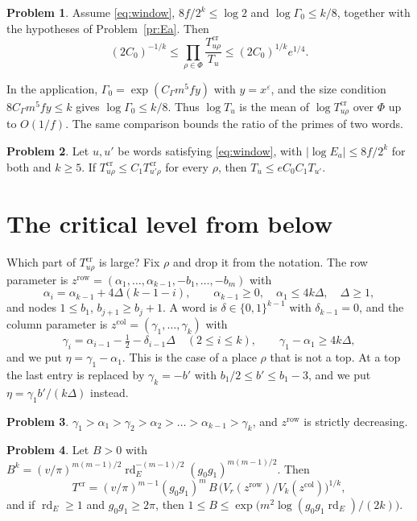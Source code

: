 \documentclass[reqno]{amsart}
\theoremstyle{definition}
\newtheorem{problem}{Problem}[section]
\theoremstyle{plain}
\theoremstyle{remark}
\newcommand{\rd}{\operatorname{rd}}
\newcommand{\Tc}{T^{\mathrm{cr}}}
\newcommand{\zr}{z^{\mathrm{row}}}
\newcommand{\zc}{z^{\mathrm{col}}}
\begin{document}
\begin{problem}\label{pr:window}
Assume \eqref{eq:window}, $8f/2^k\le\log2$ and $\log\Gamma_0\le k/8$,
together with the hypotheses of Problem~\ref{pr:Ea}.  Then
\[
 (2C_0)^{-1/k}\le\prod_{\rho\in\Phi}\frac{\Tc_{u\rho}}{T_u}
 \le(2C_0)^{1/k}e^{1/4}.
\]
\end{problem}

In the application, $\Gamma_0=\exp(C_\Gamma m^5fy)$ with $y=x^\varepsilon$, and
the size condition $8C_\Gamma m^5fy\le k$ gives $\log\Gamma_0\le k/8$.
Thus $\log T_u$ is the mean of $\log\Tc_{u\rho}$ over $\Phi$ up to
$O(1/f)$.  The same comparison bounds the ratio of the primes of two
words.

\begin{problem}\label{pr:ratio}
Let $u,u'$ be words satisfying \eqref{eq:window}, with
$|\log E_a|\le8f/2^k$ for both and $k\ge5$.  If
$\Tc_{u\rho}\le C_1\Tc_{u'\rho}$ for every $\rho$, then
$T_u\le eC_0C_1T_{u'}$.
\end{problem}

\section{The critical level from below}\label{sec:below}

Which part of $\Tc_{u\rho}$ is large?  Fix $\rho$ and drop it from the
notation.  The row parameter is
$\zr=(\alpha_1,\dots,\alpha_{k-1},-b_1,\dots,-b_m)$ with
\[
 \alpha_i=\alpha_{k-1}+4\Delta(k-1-i),\qquad
 \alpha_{k-1}\ge0,\quad \alpha_1\le4k\Delta,\quad\Delta\ge1,
\]
and nodes $1\le b_1$, $b_{j+1}\ge b_j+1$.  A word is
$\delta\in\{0,1\}^{k-1}$ with $\delta_{k-1}=0$, and the column parameter
is $\zc=(\gamma_1,\dots,\gamma_k)$ with
\[
 \gamma_i=\alpha_{i-1}-\tfrac12-\delta_{i-1}\Delta\quad(2\le i\le k),
 \qquad \gamma_1-\alpha_1\ge4k\Delta,
\]
and we put $\eta=\gamma_1-\alpha_1$.
This is the case of a place $\rho$ that is not a top.  At a top the
last entry is replaced by $\gamma_k=-b'$ with $b_1/2\le b'\le b_1-3$, and
we put $\eta=\gamma_1b'/(k\Delta)$ instead.

\begin{problem}\label{pr:interlace}
$\gamma_1>\alpha_1>\gamma_2>\alpha_2>\dots>\alpha_{k-1}>\gamma_k$, and
$\zr$ is strictly decreasing.
\end{problem}

\begin{problem}\label{pr:bracket}
Let $B>0$ with
$B^k=(v/\pi)^{m(m-1)/2}\rd_E^{-(m-1)/2}(g_0g_1)^{m(m-1)/2}$.  Then
\[
 \Tc=(v/\pi)^{m-1}(g_0g_1)^m\,B\,
 \bigl(V_r(\zr)/V_k(\zc)\bigr)^{1/k},
\]
and if $\rd_E\ge1$ and $g_0g_1\ge2\pi$, then
$1\le B\le\exp\bigl(m^2\log(g_0g_1\rd_E)/(2k)\bigr)$.
\end{problem}
\end{document}
